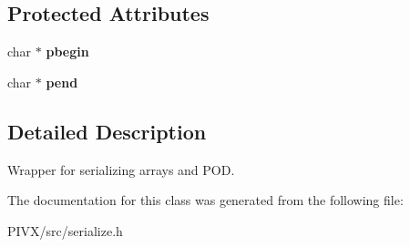 \subsection*{Protected Attributes}
\begin{DoxyCompactItemize}
\item 
\mbox{\label{class_c_flat_data_ad5f93a9d4e1cc71eb5fc94e9c9d4d89d}} 
char $\ast$ {\bfseries pbegin}
\item 
\mbox{\label{class_c_flat_data_add53aa6440254a30392bcf660f3f8057}} 
char $\ast$ {\bfseries pend}
\end{DoxyCompactItemize}


\subsection{Detailed Description}
Wrapper for serializing arrays and P\+OD. 

The documentation for this class was generated from the following file\+:\begin{DoxyCompactItemize}
\item 
P\+I\+V\+X/src/serialize.\+h\end{DoxyCompactItemize}
